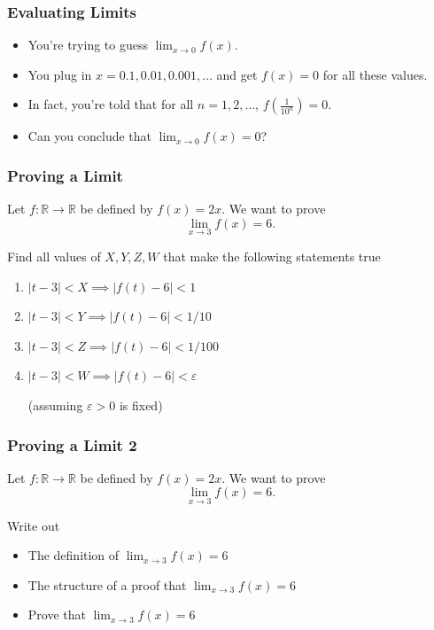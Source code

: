 \documentclass[14pt]{beamer}
\newcommand {\DS} [1] {${\displaystyle #1}$}
\newcommand{\p}{\pause}
\begin{document}
\begin{frame}
\frametitle{Evaluating Limits}

\begin{itemize}
	\item You're trying to guess $\displaystyle{\lim_{x \rightarrow 0}
f(x)}$. 

	\item You plug in $x=0.1, 0.01, 0.001, \dots$ and get $f(x)=0$ for
all these values. 

\item In fact, you're told that for all $n=1, 2, \dots$,
$\displaystyle{f\left(\frac{1}{10^n}\right)}=0$. \\

\item Can you conclude that \DS{\lim_{x \rightarrow 0}
f(x)=0}?
\end{itemize}

\end{frame}

\begin{frame}
\frametitle{Proving a Limit}

	Let $f:\mathbb R\to\mathbb R$ be defined by $f(x)=2x$. We want to prove
	\[
		\lim_{x\to 3} f(x)=6.
	\]

	\vfill
	Find all values of $X,Y,Z,W$ that make the following statements true
	\begin{enumerate}
		\item $|t-3|<X\implies |f(t)-6|<1$
		\item $|t-3|<Y\implies |f(t)-6|<1/10$
		\item $|t-3|<Z\implies |f(t)-6|<1/100$
			\vfill
		\p
	\item $|t-3|<W\implies |f(t)-6|<\varepsilon$

		(assuming $\varepsilon>0$ is fixed)
	\end{enumerate} 

\end{frame}

\begin{frame}
\frametitle{Proving a Limit 2}

	Let $f:\mathbb R\to\mathbb R$ be defined by $f(x)=2x$. We want to prove
	\[
		\lim_{x\to 3} f(x)=6.
	\]

	\vfill
	Write out
	\begin{itemize}
		\item The definition of \DS{\lim_{x\to 3}f(x)=6}
		\item The structure of a proof that \DS{\lim_{x\to 3}f(x)=6}
		\vfill\p
		\item Prove that \DS{\lim_{x\to 3}f(x)=6}
	\end{itemize}

\end{frame}
\end{document}
